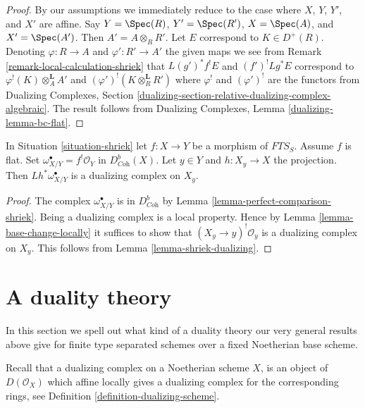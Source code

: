 \begin{proof}
By our assumptions we immediately reduce to the case where
$X$, $Y$, $Y'$, and $X'$ are affine.
Say $Y = \Spec(R)$, $Y' = \Spec(R')$, $X = \Spec(A)$, and $X' = \Spec(A')$.
Then $A' = A \otimes_R R'$. Let
$E$ correspond to $K \in D^+(R)$.
Denoting $\varphi : R \to A$ and $\varphi' : R' \to A'$
the given maps we see from
Remark \ref{remark-local-calculation-shriek}
that $L(g')^*f^!E$ and $(f')^!Lg^*E$ correspond to
$\varphi^!(K) \otimes_A^\mathbf{L} A'$ and
$(\varphi')^!(K \otimes_R^\mathbf{L} R')$
where $\varphi^!$ and $(\varphi')^!$ are the functors from
Dualizing Complexes, Section
\ref{dualizing-section-relative-dualizing-complex-algebraic}.
The result follows from
Dualizing Complexes, Lemma \ref{dualizing-lemma-bc-flat}.
\end{proof}

\begin{lemma}
\label{lemma-relative-dualizing-fibres}
In Situation \ref{situation-shriek} let $f : X \to Y$ be a morphism of
$\textit{FTS}_S$. Assume $f$ is flat. Set
$\omega_{X/Y}^\bullet = f^!\mathcal{O}_Y$ in $D^b_{\textit{Coh}}(X)$.
Let $y \in Y$ and $h : X_y \to X$ the projection.
Then $Lh^*\omega_{X/Y}^\bullet$ is a dualizing complex
on $X_y$.
\end{lemma}

\begin{proof}
The complex $\omega_{X/Y}^\bullet$ is in $D^b_{\textit{Coh}}$
by Lemma \ref{lemma-perfect-comparison-shriek}.
Being a dualizing complex is a local property.
Hence by Lemma \ref{lemma-base-change-locally}
it suffices to show that $(X_y \to y)^!\mathcal{O}_y$
is a dualizing complex on $X_y$.
This follows from Lemma \ref{lemma-shriek-dualizing}.
\end{proof}








\section{A duality theory}
\label{section-duality}

\noindent
In this section we spell out what kind of a duality theory our very general
results above give for finite type separated schemes over a fixed
Noetherian base scheme.

\medskip\noindent
Recall that a dualizing complex on a Noetherian scheme $X$, is an
object of $D(\mathcal{O}_X)$ which affine locally gives a dualizing
complex for the corresponding rings, see
Definition \ref{definition-dualizing-scheme}.

